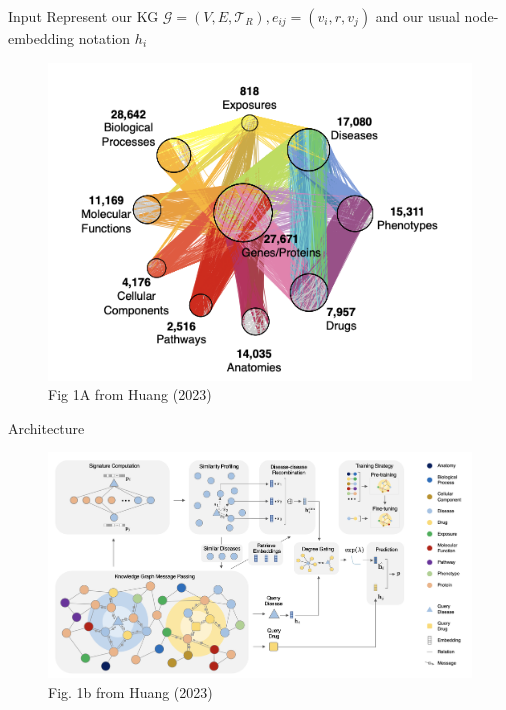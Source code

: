 \documentclass{beamer}
\newcommand{\Graph}{\mathcal{G}}
\newcommand{\NodeSet}{V}
\newcommand{\node}{v}
\newcommand{\nrepresent}{h}
\newcommand{\EdgeSet}{E}
\newcommand{\edge}{e}
\newcommand{\relation}{r}
\newcommand{\RelationSet}{\mathcal{T}_R}
\begin{document}
\begin{frame}{Input}
    Represent our KG $\Graph = (\NodeSet, \EdgeSet, \RelationSet), \edge_{ij} = (\node_i, \relation, \node_j)$ and our usual node-embedding notation $\nrepresent_i$
    \begin{figure}
        \centering 
        \includegraphics[scale=0.85]{txGNN_KG.png}
        \caption{Fig 1A from Huang (2023) \cite{huang_zero-shot_2023}}
    \end{figure}
\end{frame}



\begin{frame}{Architecture}
    \begin{figure}
        \centering
        \includegraphics[scale=0.4]{TxGNN_Arch.png}
        \caption{Fig. 1b from Huang (2023) \cite{huang_zero-shot_2023}}
    \end{figure}
\end{frame}
\end{document}
